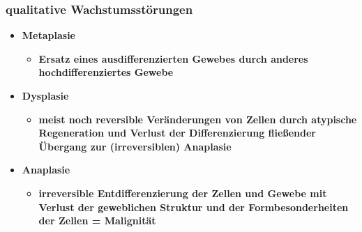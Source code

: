 \subsubsection{qualitative Wachstumsstörungen}
	\begin{itemize}
		\item \textbf{Metaplasie}
			\begin{itemize}
				\item \textbf{Ersatz eines ausdifferenzierten Gewebes durch anderes hochdifferenziertes Gewebe}
			\end{itemize}
		\item \textbf{Dysplasie}
			\begin{itemize}
				\item \textbf{meist noch reversible Veränderungen von Zellen durch atypische Regeneration und Verlust der Differenzierung fließender Übergang zur (irreversiblen) Anaplasie}
			\end{itemize}
		\item \textbf{Anaplasie}
			\begin{itemize}
				\item \textbf{irreversible Entdifferenzierung der Zellen und Gewebe mit Verlust der geweblichen Struktur und der Formbesonderheiten der Zellen = Malignität}
			\end{itemize}
	\end{itemize}